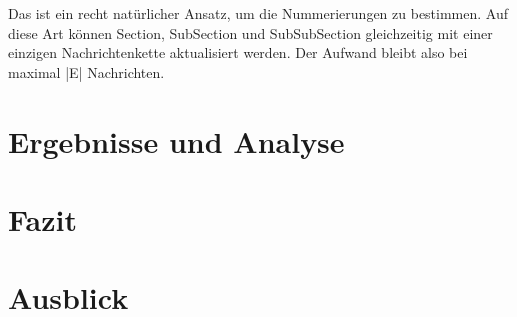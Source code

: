 Das ist ein recht natürlicher Ansatz, um die Nummerierungen zu bestimmen.
Auf diese Art können Section, SubSection und SubSubSection gleichzeitig
mit einer einzigen Nachrichtenkette aktualisiert werden.
Der Aufwand bleibt also bei maximal |E| Nachrichten.


\chapter{Ergebnisse und Analyse}


\chapter{Fazit}


\chapter{Ausblick}


